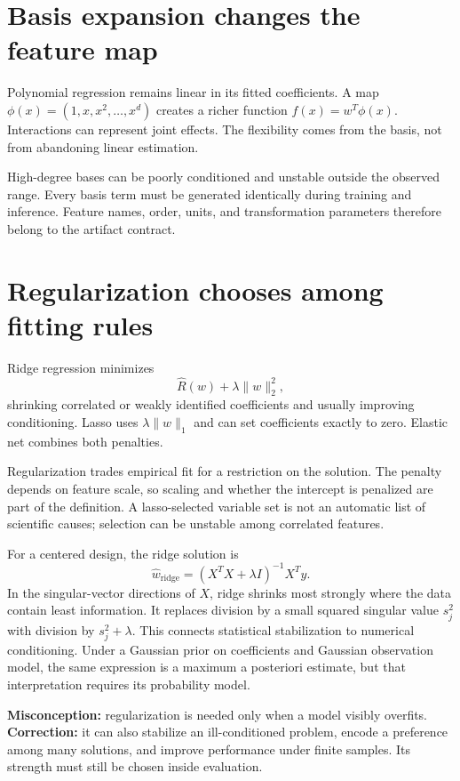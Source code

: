 \section{Basis expansion changes the feature map}

Polynomial regression remains linear in its fitted coefficients. A map
$\phi(x)=(1,x,x^2,\ldots,x^d)$ creates a richer function
$f(x)=w^T\phi(x)$. Interactions can represent joint effects. The flexibility
comes from the basis, not from abandoning linear estimation.

High-degree bases can be poorly conditioned and unstable outside the observed
range. Every basis term must be generated identically during training and
inference. Feature names, order, units, and transformation parameters therefore
belong to the artifact contract.

\section{Regularization chooses among fitting rules}

Ridge regression minimizes
\[
\widehat R(w)+\lambda\lVert w\rVert_2^2,
\]
shrinking correlated or weakly identified coefficients and usually improving
conditioning. Lasso uses $\lambda\lVert w\rVert_1$ and can set coefficients
exactly to zero. Elastic net combines both penalties.

Regularization trades empirical fit for a restriction on the solution. The
penalty depends on feature scale, so scaling and whether the intercept is
penalized are part of the definition. A lasso-selected variable set is not an
automatic list of scientific causes; selection can be unstable among correlated
features.

For a centered design, the ridge solution is
\[
\widehat w_{\mathrm{ridge}}
=(X^TX+\lambda I)^{-1}X^Ty.
\]
In the singular-vector directions of $X$, ridge shrinks most strongly where the
data contain least information. It replaces division by a small squared
singular value $s_j^2$ with division by $s_j^2+\lambda$. This connects
statistical stabilization to numerical conditioning. Under a Gaussian prior on
coefficients and Gaussian observation model, the same expression is a maximum
a posteriori estimate, but that interpretation requires its probability model.

\begin{misconceptionbox}
\textbf{Misconception:} regularization is needed only when a model visibly
overfits. \textbf{Correction:} it can also stabilize an ill-conditioned
problem, encode a preference among many solutions, and improve performance
under finite samples. Its strength must still be chosen inside evaluation.
\end{misconceptionbox}

